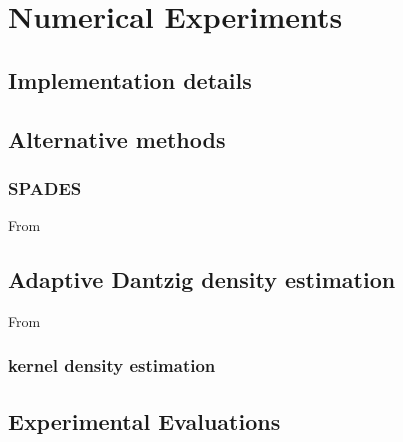 \documentclass[11pt]{article}
\theoremstyle{plain}
\theoremstyle{definition}
\begin{document}
\section{Numerical Experiments}

\subsection{Implementation details}

\subsection{Alternative methods}
\subsubsection{SPADES}
From \cite{SPADES}
\subsection{Adaptive Dantzig density estimation}
From \cite{Bertin}
\subsubsection{kernel density estimation}

\subsection{Experimental Evaluations}
 


\end{document}
